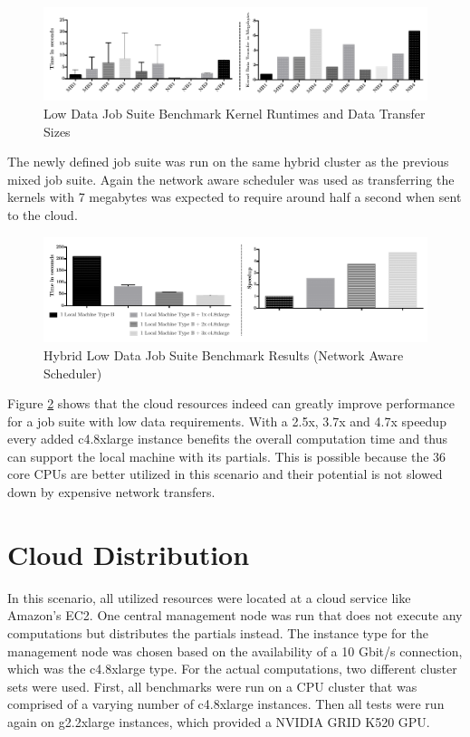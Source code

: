 \begin{figure}[!htb]
	\includegraphics[width=1.0\textwidth]{images/lowdata_benchmark_statistics.pdf}
	\centering
	\caption{Low Data Job Suite Benchmark Kernel Runtimes and Data Transfer Sizes}
	\label{img:low_data_benchmark_statistics}
\end{figure}

The newly defined job suite was run on the same hybrid cluster as the previous mixed job suite. Again the network aware scheduler was used as transferring the kernels with 7 megabytes was expected to require around half a second when sent to the cloud.

\begin{figure}[!htb]
	\includegraphics[width=1.0\textwidth]{images/hybrid_lowdata_benchmark.pdf}
	\centering
	\caption{Hybrid Low Data Job Suite Benchmark Results (Network Aware Scheduler)}
	\label{img:hybrid_low_data_benchmark_results_network_aware}
\end{figure}

Figure \ref{img:hybrid_low_data_benchmark_results_network_aware} shows that the cloud resources indeed can greatly improve performance for a job suite with low data requirements. With a 2.5x, 3.7x and 4.7x speedup every added c4.8xlarge instance benefits the overall computation time and thus can support the local machine with its partials. This is possible because the 36 core CPUs are better utilized in this scenario and their potential is not slowed down by expensive network transfers.

\section{Cloud Distribution}

In this scenario, all utilized resources were located at a cloud service like Amazon's EC2. One central management node was run that does not execute any computations but distributes the partials instead. The instance type for the management node was chosen based on the availability of a 10 Gbit/s connection, which was the c4.8xlarge type. For the actual computations, two different cluster sets were used. First, all benchmarks were run on a CPU cluster that was comprised of a varying number of c4.8xlarge instances. Then all tests were run again on g2.2xlarge instances, which provided a NVIDIA GRID K520 GPU.

